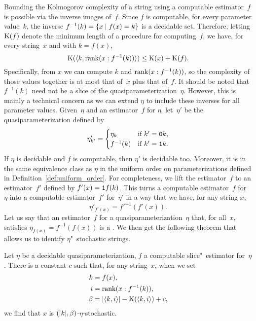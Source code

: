 Bounding the Kolmogorov complexity of a string using a computable estimator~$f$ is possible via the inverse images of~$f$.
Since $f$ is computable, for every parameter value~$k$, the inverse $f^{-1}(k) = \{x \;|\; f(x) = k\}$ is a decidable set.
Therefore, letting $\operatorname{K}(f)$ denote the minimum length of a procedure for computing~$f$, we have, for every string~$x$ and with $k = f(x)$,
\begin{equation}
\label{eq:kclowerbound}
  \operatorname{K}({\langle k, \operatorname{rank}(x : f^{-1}(k))\rangle}) \le \operatorname{K}(x) + \operatorname{K}(f).
\end{equation}
Specifically, from $x$ we can compute $k$ and $\operatorname{rank}(x : f^{-1}(k))$, so the complexity of those values together is at most that of~$x$ plus that of~$f$.
It should be noted that $f^{-1}(k)$ need not be a slice of the quasiparameterization~$\eta$.
However, this is mainly a technical concern as we can extend $\eta$ to include these inverses for all parameter values.
Given~$\eta$ and an estimator~$f$ for $\eta$, let~$\eta'$ be the quasiparameterization defined by
\begin{equation*}
  \eta'_{k'} = \begin{cases}
    \eta_k	&\text{if $k' = \textnormal{\texttt{0}}k$}, \\
    f^{-1}(k)	&\text{if $k' = \textnormal{\texttt{1}}k$}.
  \end{cases}
\end{equation*}
If $\eta$ is decidable and $f$ is computable, then $\eta'$ is decidable too.
Moreover, it is in the same equivalence class as $\eta$ in the uniform order on parameterizations defined in Definition~\ref{def:uniform_order}.
For completeness, we lift the estimator~$f$ to an estimator~$f'$ defined by $f'(x) = \textnormal{\texttt{1}}f(k)$.
This turns a computable estimator~$f$ for~$\eta$ into a computable estimator~$f'$ for~$\eta'$ in a way that we have, for any string $x$,
\begin{equation*}
  \eta'_{f'(x)} = f'^{-1}(f'(x)).
\end{equation*}
Let us say that an estimator~$f$ for a quasiparameterization~$\eta$ that, for all~$x$, satisfies $\eta_{f(x)} = f^{-1}(f(x))$ is a .
We then get the following theorem that allows us to identify $\eta$"~stochastic strings.
\begin{theorem}
\label{thm:etastochastic}%
  Let $\eta$ be a decidable quasiparameterization, $f$ a computable slice"~estimator for~$\eta$.
  There is a constant $c$ such that, for any string~$x$, when we set
  \begin{align*}
    k &= f(x), \\
    i &= \operatorname{rank}(x : f^{-1}(k)), \\
    \beta &= {\lvert{\langle k, i\rangle}\rvert} - \operatorname{K}({\langle k, i\rangle}) + c,
  \end{align*}
  we find that $x$ is $({\lvert k\rvert}, \beta)$-$\eta$-stochastic.
\end{theorem}
